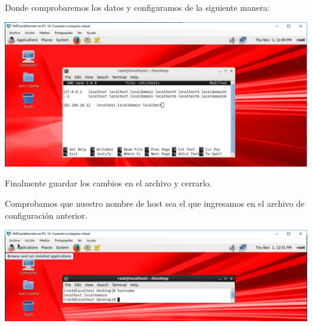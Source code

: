 \vspace{\baselineskip}

Donde comprobaremos los datos y configuramos de la siguiente manera:
\begin{center}
	\includegraphics[width=17cm]{./Imagenes/51} 
\end{center} 
Finalmente guardar los cambios en el archivo y cerrarlo.

\vspace{\baselineskip}

Comprobamos que nuestro nombre de host sea el que ingresamos en el archivo de configuración anterior.
\begin{center}
	\includegraphics[width=17cm]{./Imagenes/52} 
\end{center} 

\vspace{\baselineskip}


